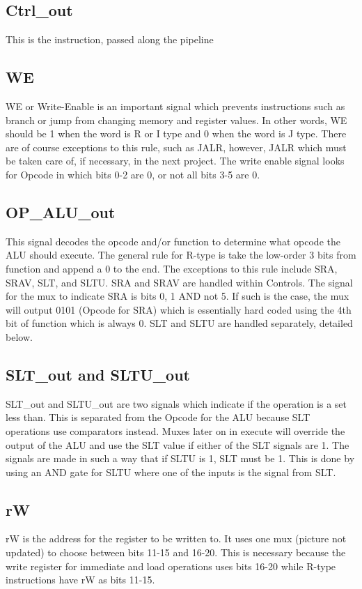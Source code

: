 \documentclass[10pt]{article}
\begin{document}
\subsection{Ctrl\_out}
This is the instruction, passed along the pipeline

\subsection{WE}
WE or Write-Enable is an important signal which prevents instructions such as branch or jump from changing memory and register values. In other words, WE should be 1 when the word is R or I type and 0 when the word is J type. There are of course exceptions to this rule, such as JALR, however, JALR which must be taken care of, if necessary, in the next project. The write enable signal looks for Opcode in which bits 0-2 are 0, or not all bits 3-5 are 0.

\subsection{OP\_ALU\_out}
This signal decodes the opcode and/or function to determine what opcode the ALU should execute. The general rule for R-type is take the low-order 3 bits from function and append a 0 to the end. The exceptions to this rule include SRA, SRAV, SLT, and SLTU. SRA and SRAV are handled within Controls. The signal for the mux to indicate SRA is bits 0, 1 AND not 5. If such is the case, the mux will output 0101 (Opcode for SRA) which is essentially hard coded using the 4th bit of function which is always 0. SLT and SLTU are handled separately, detailed below. 

\subsection{SLT\_out and SLTU\_out}
SLT\_out and SLTU\_out are two signals which indicate if the operation is a set less than. This is separated from the Opcode for the ALU because SLT operations use comparators instead. Muxes later on in execute will override the output of the ALU and use the SLT value if either of the SLT signals are 1. The signals are made in such a way that if SLTU is 1, SLT must be 1. This is done by using an AND gate for SLTU where one of the inputs is the signal from SLT.

\subsection{rW}
rW is the address for the register to be written to. It uses one mux (picture not updated) to choose between bits 11-15 and 16-20. This is necessary because the write register for immediate and load operations uses bits 16-20 while R-type instructions have rW as bits 11-15. 
\end{document}
